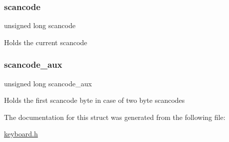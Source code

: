 \subsubsection{\texorpdfstring{scancode}{scancode}}
{\footnotesize\ttfamily unsigned long scancode}

Holds the current scancode \hypertarget{struct_keyboard_a47f04d0965fb400bb993629770de3f23}{}\label{struct_keyboard_a47f04d0965fb400bb993629770de3f23} 
\subsubsection{\texorpdfstring{scancode\+\_\+aux}{scancode\_aux}}
{\footnotesize\ttfamily unsigned long scancode\+\_\+aux}

Holds the first scancode byte in case of two byte scancodes 

The documentation for this struct was generated from the following file\+:\begin{DoxyCompactItemize}
\item 
\hyperlink{keyboard_8h}{keyboard.\+h}\end{DoxyCompactItemize}

